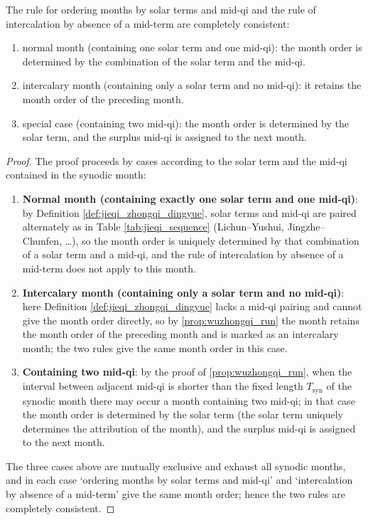 \begin{proposition}\label{prop:dingyue_consistency}
The rule for ordering months by solar terms and mid-qi and the rule of intercalation by absence of a mid-term are completely consistent:
\begin{enumerate}[label=(\roman*)]
    \item normal month (containing one solar term and one mid-qi): the month order is determined by the combination of the solar term and the mid-qi.
    \item intercalary month (containing only a solar term and no mid-qi): it retains the month order of the preceding month.
    \item special case (containing two mid-qi): the month order is determined by the solar term, and the surplus mid-qi is assigned to the next month.
\end{enumerate}
\end{proposition}

\begin{proof}
The proof proceeds by cases according to the solar term and the mid-qi contained in the synodic month:
\begin{enumerate}[label=(\roman*)]
\item \textbf{Normal month (containing exactly one solar term and one mid-qi)}: by Definition \ref{def:jieqi_zhongqi_dingyue}, solar terms and mid-qi are paired alternately as in Table \ref{tab:jieqi_sequence} (Lichun--Yushui, Jingzhe--Chunfen, \dots), so the month order is uniquely determined by that combination of a solar term and a mid-qi, and the rule of intercalation by absence of a mid-term does not apply to this month.
\item \textbf{Intercalary month (containing only a solar term and no mid-qi)}: here Definition \ref{def:jieqi_zhongqi_dingyue} lacks a mid-qi pairing and cannot give the month order directly, so by \cref{prop:wuzhongqi_run} the month retains the month order of the preceding month and is marked as an intercalary month; the two rules give the same month order in this case.
\item \textbf{Containing two mid-qi}: by the proof of \cref{prop:wuzhongqi_run}, when the interval between adjacent mid-qi is shorter than the fixed length \(T_{\text{syn}}\) of the synodic month there may occur a month containing two mid-qi; in that case the month order is determined by the solar term (the solar term uniquely determines the attribution of the month), and the surplus mid-qi is assigned to the next month.
\end{enumerate}
The three cases above are mutually exclusive and exhaust all synodic months, and in each case `ordering months by solar terms and mid-qi' and `intercalation by absence of a mid-term' give the same month order; hence the two rules are completely consistent.
\end{proof}

